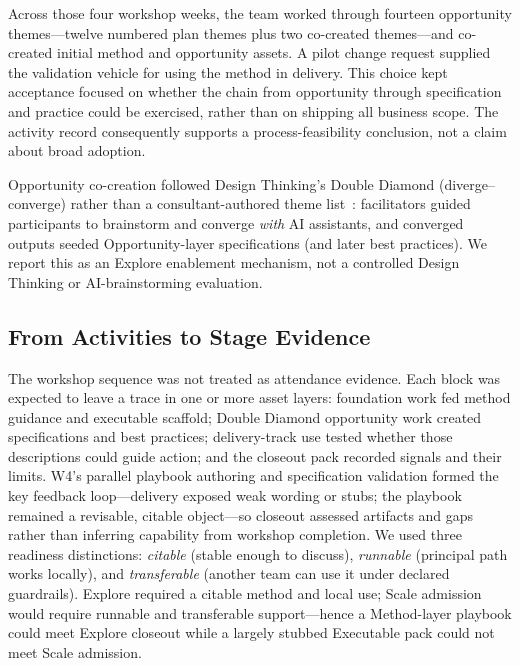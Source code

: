 \documentclass[10pt,conference]{IEEEtran}
\begin{document}
Across those four workshop weeks, the team worked through fourteen opportunity
themes---twelve numbered plan themes plus two co-created themes---and
co-created initial method and opportunity assets.  A pilot change
request supplied the validation vehicle for using the method in delivery.
This choice kept acceptance focused on whether the chain from opportunity
through specification and practice could be exercised, rather than on
shipping all business scope.  The activity record consequently supports a
process-feasibility conclusion, not a claim about broad adoption.

Opportunity co-creation followed Design Thinking's Double Diamond
(diverge--converge) rather than a consultant-authored theme
list~\cite{DesignCouncilDoubleDiamond}: facilitators guided participants to
brainstorm and converge \emph{with} AI assistants, and converged outputs seeded
Opportunity-layer specifications (and later best practices).
We report this as an Explore enablement mechanism, not a controlled Design
Thinking or AI-brainstorming evaluation.

\subsection{From Activities to Stage Evidence}

The workshop sequence was not treated as attendance evidence.  Each block
was expected to leave a trace in one or more asset layers: foundation work
fed method guidance and executable scaffold; Double Diamond opportunity work
created specifications and best practices; delivery-track use tested whether
those descriptions could guide action; and the closeout pack recorded signals
and their limits.
W4's parallel playbook authoring and specification validation formed the key
feedback loop---delivery exposed weak wording or stubs; the playbook remained
a revisable, citable object---so closeout assessed artifacts and gaps rather
than inferring capability from workshop completion.
We used three readiness distinctions: \emph{citable} (stable enough to discuss),
\emph{runnable} (principal path works locally), and \emph{transferable}
(another team can use it under declared guardrails).
Explore required a citable method and local use; Scale admission would require
runnable and transferable support---hence a Method-layer playbook could meet
Explore closeout while a largely stubbed Executable pack could not meet Scale
admission.
\end{document}
